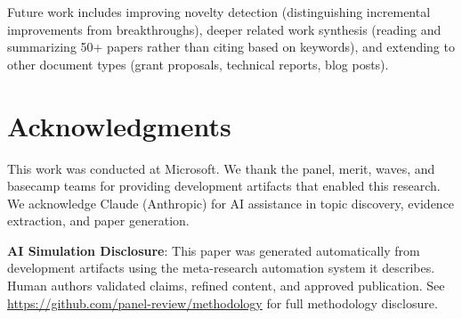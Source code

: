 Future work includes improving novelty detection (distinguishing incremental improvements from breakthroughs), deeper related work synthesis (reading and summarizing 50+ papers rather than citing based on keywords), and extending to other document types (grant proposals, technical reports, blog posts).

\section*{Acknowledgments}

This work was conducted at Microsoft. We thank the panel, merit, waves, and basecamp teams for providing development artifacts that enabled this research. We acknowledge Claude (Anthropic) for AI assistance in topic discovery, evidence extraction, and paper generation.

\textbf{AI Simulation Disclosure}: This paper was generated automatically from development artifacts using the meta-research automation system it describes. Human authors validated claims, refined content, and approved publication. See \url{https://github.com/panel-review/methodology} for full methodology disclosure.